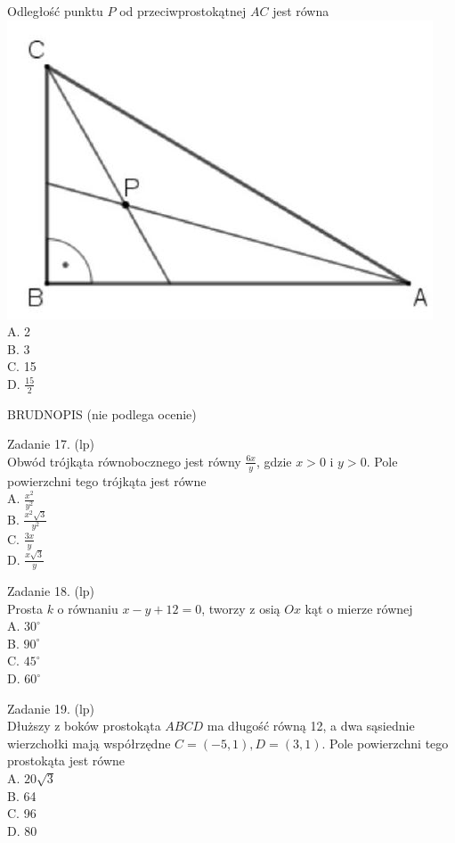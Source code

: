 \documentclass[10pt]{article}
\begin{document}
Odległość punktu \(P\) od przeciwprostokątnej \(A C\) jest równa\\
\includegraphics[max width=\textwidth, center]{2024_11_21_e376e4ee4a8b7ab03731g-04}\\
A. 2\\
B. 3\\
C. 15\\
D. \(\frac{15}{2}\)

BRUDNOPIS (nie podlega ocenie)

Zadanie 17. (lp)\\
Obwód trójkąta równobocznego jest równy \(\frac{6 x}{y}\), gdzie \(x>0\) i \(y>0\). Pole powierzchni tego trójkąta jest równe\\
A. \(\frac{x^{2}}{y^{2}}\)\\
B. \(\frac{x^{2} \sqrt{3}}{y^{2}}\)\\
C. \(\frac{3 x}{y}\)\\
D. \(\frac{x \sqrt{3}}{y}\)

Zadanie 18. (lp)\\
Prosta \(k\) o równaniu \(x-y+12=0\), tworzy z osią \(O x\) kąt o mierze równej\\
A. \(30^{\circ}\)\\
B. \(90^{\circ}\)\\
C. \(45^{\circ}\)\\
D. \(60^{\circ}\)

Zadanie 19. (lp)\\
Dłuższy z boków prostokąta \(A B C D\) ma długość równą 12, a dwa sąsiednie wierzchołki mają współrzędne \(C=(-5,1), D=(3,1)\). Pole powierzchni tego prostokąta jest równe\\
A. \(20 \sqrt{3}\)\\
B. 64\\
C. 96\\
D. 80
\end{document}

